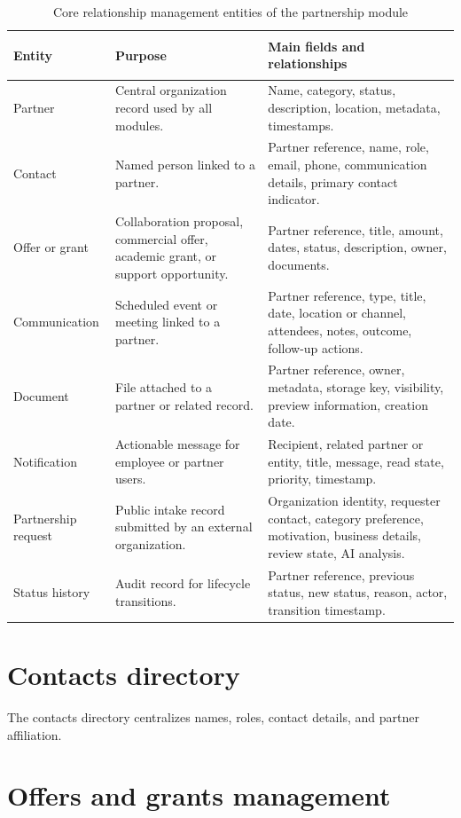 \begin{table}[H]
  \centering
  \caption{Core relationship management entities of the partnership module}
  \begin{tabularx}{\textwidth}{>{\bfseries\raggedright\arraybackslash}p{3.2cm}X X}
    \toprule
    Entity & Purpose & Main fields and relationships \\
    \midrule
    Partner & Central organization record used by all modules. & Name, category, status, description, location, metadata, timestamps. \\
    Contact & Named person linked to a partner. & Partner reference, name, role, email, phone, communication details, primary contact indicator. \\
    Offer or grant & Collaboration proposal, commercial offer, academic grant, or support opportunity. & Partner reference, title, amount, dates, status, description, owner, documents. \\
    Communication & Scheduled event or meeting linked to a partner. & Partner reference, type, title, date, location or channel, attendees, notes, outcome, follow-up actions. \\
    Document & File attached to a partner or related record. & Partner reference, owner, metadata, storage key, visibility, preview information, creation date. \\
    Notification & Actionable message for employee or partner users. & Recipient, related partner or entity, title, message, read state, priority, timestamp. \\
    Partnership request & Public intake record submitted by an external organization. & Organization identity, requester contact, category preference, motivation, business details, review state, AI analysis. \\
    Status history & Audit record for lifecycle transitions. & Partner reference, previous status, new status, reason, actor, transition timestamp. \\
    \bottomrule
  \end{tabularx}
\end{table}

\section{Contacts directory}

The contacts directory centralizes names, roles, contact details, and partner affiliation.

\section{Offers and grants management}

